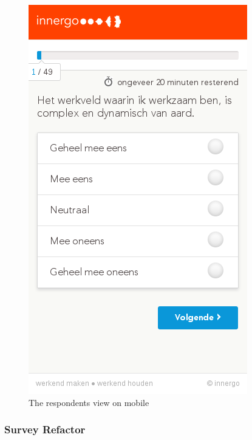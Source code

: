 \documentclass[10pt,a4paper]{beamer}
\begin{document}
\begin{frame}

\begin{figure}[htp]
\centering
\includegraphics[scale=0.32]{../img/calibris3.png}
 \caption{The respondents view on mobile}
 \label{fig.calibris3}
\end{figure}

\end{frame}

\subsubsection{Survey Refactor}
\end{document}
